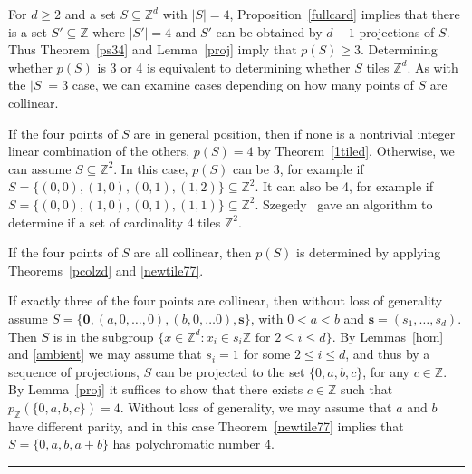 \documentclass[12pt]{article}
\newenvironment{proof}{{\bf Proof:  }}{\hfill\rule{2mm}{2mm}}
\newcommand{\Z}{\ensuremath{\mathbb Z}}
\newcommand{\vect}[1]{\bm{#1}}
\begin{document}
\begin{proof}
 For $d \ge 2$ and a set $S\subseteq \Z^d$ with $|S|=4$,  Proposition~\ref{fullcard} implies that there is a set $S' \subseteq \Z$ where $|S'|=4$ and $S'$ can be obtained by $d-1$ projections of $S$. Thus Theorem~\ref{ps34} and Lemma~\ref{proj} imply that $p(S)\ge 3$. Determining whether $p(S)$ is 3 or 4 is equivalent to determining whether $S$ tiles $\Z^d$.  As with the $|S|=3$ case, we can examine cases depending on how many points of $S$ are collinear.

If the four points of $S$ are in general position, then if none is a nontrivial integer linear combination of the others, $p(S)=4$ by Theorem~\ref{1tiled}.  Otherwise, we can assume $S\subseteq \Z^2$.  In this case, $p(S)$ can be 3, for example if $S=\{(0,0), (1,0), (0,1), (1,2)\} \subseteq \Z^2$. It can also be 4, for example if $S=\{(0,0), (1,0), (0,1), (1,1)\} \subseteq \Z^2$.  Szegedy~\cite{Sz01} gave an algorithm to determine if a set of cardinality 4 tiles $\Z^2$.

If the four points of $S$ are all collinear, then $p(S)$ is determined by applying Theorems~\ref{pcolzd} and \ref{newtile77}.

If exactly three of the four points are collinear, then without loss of generality assume $S= \{\vect{0}, (a,0, \ldots, 0), (b,0,\ldots 0), \vect{s}\}$, with $0<a<b$ and $\vect{s} = (s_1, \ldots, s_d)$. Then $S$ is in the subgroup $\{x \in \Z^d: x_i \in s_i\Z \text{ for } 2 \le i \le d\}$.  By Lemmas~\ref{hom} and \ref{ambient} we may assume that $s_i=1$ for some $2 \le i \le d$, and thus by a sequence of projections, $S$ can be projected to the set $\{0, a, b, c\}$, for any $c \in \Z$. By Lemma~\ref{proj} it suffices to show that there exists $c\in \Z$ such that $p_{\Z}(\{0, a, b, c\})=4$. Without loss of generality, we may assume that $a$ and $b$ have different parity, and in this case Theorem~\ref{newtile77} implies that $S=\{0,a,b,a+b\}$ has polychromatic number 4.
\end{proof}
\end{document}
